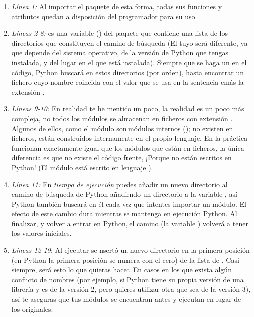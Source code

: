\begin{enumerate}

\item \emph{Línea 1:} Al importar el paquete  de esta forma, todas sus funciones y atributos quedan a disposición del programador para su uso.

\item \emph{Líneas 2-8:}  es una variable () del paquete  que contiene una lista de los directorios que constituyen el camino de búsqueda (El tuyo será diferente, ya que depende del sistema operativo, de la versión de Python que tengas instalada, y del lugar en el que está instalada). Siempre que se haga un  en el código, Python buscará en estos directorios (por orden), hasta encontrar un fichero cuyo nombre coincida con el valor que se usa en la sentencia  cmás la extensión .

\item \emph{Líneas 9-10:} En realidad te he mentido un poco, la realidad es un poco más compleja, no todos los módulos se almacenan en ficheros con extensión . Algunos de ellos, como el módulo  son módulos internos (); no existen en ficheros, están construidos internamente en el propio lenguaje. En la práctica funcionan exactamente igual que los módulos que están en ficheros, la única diferencia es que no existe el código fuente, ¡Porque no están escritos en Python! (El módulo  está escrito en lenguaje ).

\item \emph{Línea 11:} En \emph{tiempo de ejecución} puedes añadir un nuevo directorio al camino de búsqueda de Python añadiendo un directorio a la variable , así Python también buscará en él cada vez que intentes importar un módulo. El efecto de este cambio dura mientras se mantenga en ejecución Python. Al finalizar, y volver a entrar en Python, el camino (la variable ) volverá a tener los valores iniciales.

\item \emph{Líneas 12-19}: Al ejecutar  se nsertó un nuevo directorio en la primera posición (en Python la primera posición se numera con el cero) de la lista de . Casi siempre, será esto lo que quieras hacer. En casos en los que exista algún conflicto de nombres (por ejemplo, si Python tiene su propia versión de una librería y es de la versión 2, pero quieres utilizar otra que sea de la versión 3), así te aseguras que tus módulos se encuentran antes y ejecutan en lugar de los originales.

\end{enumerate}

